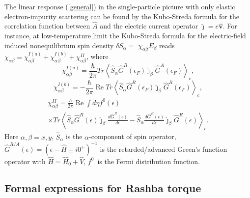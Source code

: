 \documentclass
[aps,pra,amsfonts,amssymb,twocolumn,amsmath,preprintnumbers,nofootinbib,floatfix,
showpacs,superscriptaddress]{revtex4-1}%
\begin{document}
The linear response (\ref{general}) in the single-particle picture with only
elastic electron-impurity scattering can be found by the Kubo-Streda formula
\cite{Bruno2001,Ebert2015} for the correlation function between $\hat{A}$ and
the electric current operator $\mathbf{\hat{\jmath}}=e\mathbf{\hat{v}}$. For
instance, at low-temperature limit the Kubo-Streda formula for the
electric-field induced nonequilibrium spin density $\delta S_{\alpha}=$
$\chi_{\alpha\beta}E_{\beta}$ reads \cite{Ebert2015,Titov2017} $\chi
_{\alpha\beta}=\chi_{\alpha\beta}^{I\left(  a\right)  }+\chi_{\alpha\beta
}^{I\left(  b\right)  }+\chi_{\alpha\beta}^{II}$, where
\begin{equation}
\chi_{\alpha\beta}^{I\left(  a\right)  }=\frac{\hbar}{2\pi}Tr\left\langle
\hat{S}_{\alpha}\hat{G}^{R}\left(  \epsilon_{F}\right)  \hat{\jmath}_{\beta
}\hat{G}^{A}\left(  \epsilon_{F}\right)  \right\rangle _{c}, \label{surface-a}%
\end{equation}%
\begin{equation}
\chi_{\alpha\beta}^{I\left(  b\right)  }=-\frac{\hbar}{2\pi}\operatorname{Re}%
Tr\left\langle \hat{S}_{\alpha}\hat{G}^{R}\left(  \epsilon_{F}\right)
\hat{\jmath}_{\beta}\hat{G}^{R}\left(  \epsilon_{F}\right)  \right\rangle
_{c}, \label{surface-b}%
\end{equation}%
\begin{gather}
\chi_{\alpha\beta}^{II}=\frac{\hbar}{2\pi}\operatorname{Re}\int d\eta
f^{0}\left(  \epsilon\right) \label{sea}\\
\times Tr\left\langle \hat{S}_{\alpha}\hat{G}^{R}\left(  \epsilon\right)
\hat{\jmath}_{\beta}\frac{d\hat{G}^{R}\left(  \epsilon\right)  }{d\epsilon
}-\hat{S}_{\alpha}\frac{d\hat{G}^{R}\left(  \epsilon\right)  }{d\epsilon}%
\hat{\jmath}_{\beta}\hat{G}^{R}\left(  \epsilon\right)  \right\rangle
_{c}.\nonumber
\end{gather}
Here $\alpha,\beta=x,y$, $\hat{S}_{\alpha}$ is the $\alpha$-component of spin
operator, $\hat{G}^{R/A}\left(  \epsilon\right)  =\left(  \epsilon-\hat{H}\pm
i0^{+}\right)  ^{-1}$ is the retarded/advanced Green's function operator with
$\hat{H}=\hat{H}_{0}+\hat{V}$, $f^{0}$\ is the Fermi distribution function.

\subsection{Formal expressions for Rashba torque}
\end{document}
